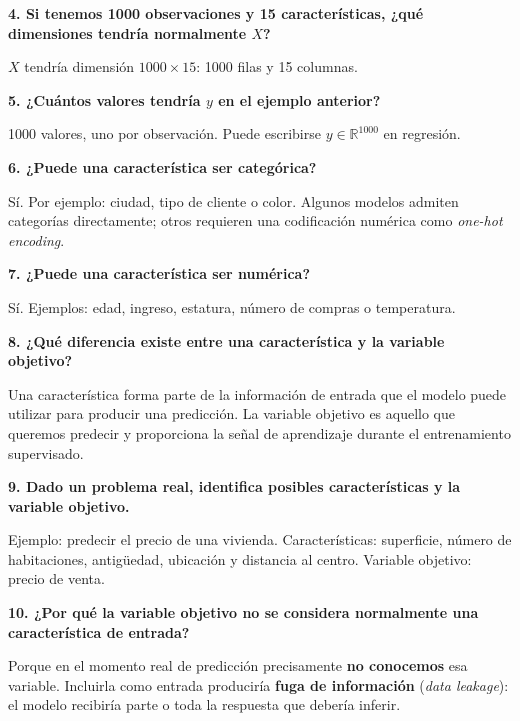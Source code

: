 \documentclass[11pt]{article}
\newcommand{\pregunta}[1]{\vspace{2mm}\textbf{#1}}
\newcommand{\R}{\mathbb{R}}
\begin{document}
\pregunta{4. Si tenemos 1000 observaciones y 15 características, ¿qué dimensiones tendría normalmente $X$?}
\begin{respuesta}
$X$ tendría dimensión $1000\times 15$: 1000 filas y 15 columnas.
\end{respuesta}

\pregunta{5. ¿Cuántos valores tendría $y$ en el ejemplo anterior?}
\begin{respuesta}
1000 valores, uno por observación. Puede escribirse $y\in\R^{1000}$ en regresión.
\end{respuesta}

\pregunta{6. ¿Puede una característica ser categórica?}
\begin{respuesta}
Sí. Por ejemplo: ciudad, tipo de cliente o color. Algunos modelos admiten categorías directamente; otros requieren una codificación numérica como \emph{one-hot encoding}.
\end{respuesta}

\pregunta{7. ¿Puede una característica ser numérica?}
\begin{respuesta}
Sí. Ejemplos: edad, ingreso, estatura, número de compras o temperatura.
\end{respuesta}

\pregunta{8. ¿Qué diferencia existe entre una característica y la variable objetivo?}
\begin{respuesta}
Una característica forma parte de la información de entrada que el modelo puede utilizar para producir una predicción. La variable objetivo es aquello que queremos predecir y proporciona la señal de aprendizaje durante el entrenamiento supervisado.
\end{respuesta}

\pregunta{9. Dado un problema real, identifica posibles características y la variable objetivo.}
\begin{respuesta}
Ejemplo: predecir el precio de una vivienda. Características: superficie, número de habitaciones, antigüedad, ubicación y distancia al centro. Variable objetivo: precio de venta.
\end{respuesta}

\pregunta{10. ¿Por qué la variable objetivo no se considera normalmente una característica de entrada?}
\begin{respuesta}
Porque en el momento real de predicción precisamente \textbf{no conocemos} esa variable. Incluirla como entrada produciría \textbf{fuga de información} (\emph{data leakage}): el modelo recibiría parte o toda la respuesta que debería inferir.
\end{respuesta}
\end{document}
